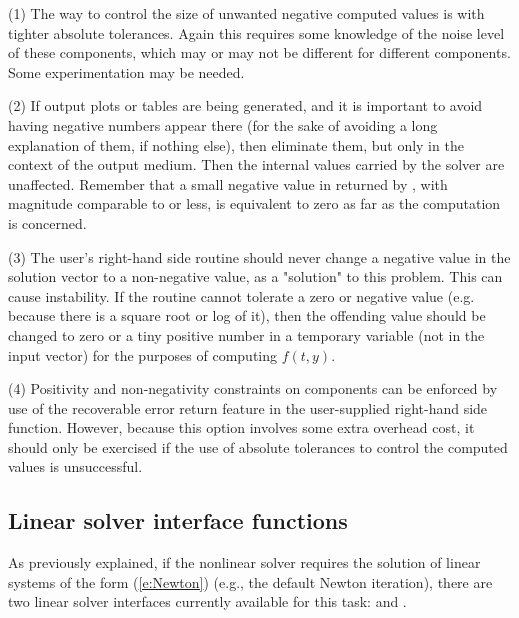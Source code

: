 (1) The way to control the size of unwanted negative computed values
is with tighter absolute tolerances.  Again this requires some
knowledge of the noise level of these components, which may or may not
be different for different components.  Some experimentation may be
needed.

(2) If output plots or tables are being generated, and it is important
to avoid having negative numbers appear there (for the sake of avoiding
a long explanation of them, if nothing else), then eliminate them, but
only in the context of the output medium.  Then the internal values carried
by the solver are unaffected.  Remember that a small negative value in 
returned by {\cvodes}, with magnitude comparable to  or less,
is equivalent to zero as far as the computation is concerned.

(3) The user's right-hand side routine  should never change a
negative value in the solution vector  to a non-negative value,
as a "solution" to this problem.  This can cause instability.  If the
 routine cannot tolerate a zero or negative value (e.g. because
there is a square root or log of it), then the offending value should
be changed to zero or a tiny positive number in a temporary variable
(not in the input  vector) for the purposes of computing $f(t,y)$.

(4) Positivity and non-negativity constraints on components can be
enforced by use of the recoverable error return feature in the
user-supplied right-hand side function.  However, because this option
involves some extra overhead cost, it should only be exercised if the
use of absolute tolerances to control the computed values is
unsuccessful.

\subsection{Linear solver interface functions}\label{sss:lin_solv_init}

As previously explained, if the nonlinear solver requires the solution of
linear systems of the form (\ref{e:Newton}) (e.g., the default Newton
iteration), there are two {\cvodes} linear solver interfaces currently
available for this task: {\cvls} and {\cvdiag}.

